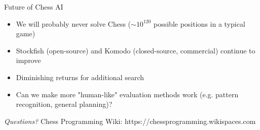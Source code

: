 \documentclass[xcolor=pdftex,dvipsnames,table]{beamer}
\begin{document}
\begin{frame}{Future of Chess AI}
\begin{itemize}
\item We will probably never solve Chess ($\sim 10^{120}$ possible positions in a typical game)
\item Stockfish (open-source) and Komodo (closed-source, commercial) continue to improve
\item Diminishing returns for additional search
\item Can we make more "human-like" evaluation methods work (e.g. pattern recognition, general planning)?
\end{itemize}
\end{frame}

\begin{frame}{}
  \centering
  \vspace{50pt} 
  \LARGE
  \emph{Questions?}
  \small
  \vspace{30pt}
  \linebreak
  Chess Programming Wiki: \linebreak
  https://chessprogramming.wikispaces.com
\end{frame}
\end{document}
